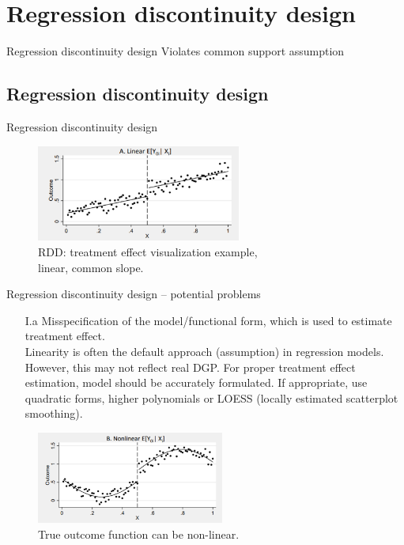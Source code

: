 \documentclass{beamer}
\begin{document}
\section{Regression discontinuity design}
\begin{frame}{Regression discontinuity design}
    Violates common support assumption
\end{frame}
\subsection{Regression discontinuity design}
\begin{frame}{Regression discontinuity design}
\begin{figure}
    \centering
    \includegraphics[width=0.6\textwidth]{./IMG/RDD1.png} 
    \caption*{RDD: treatment effect visualization example,\\ linear, common slope.}
    \label{fig:my_label}
\end{figure}    
  
    
\end{frame}
\begin{frame}{Regression discontinuity design -- potential problems}
\begin{itemize}
    \item[I.a] Misspecification of the model/functional form, which is used to estimate treatment effect.\\
    \bigskip
    Linearity is often the default approach (assumption) in regression models. However, this may not reflect real DGP. For proper treatment effect estimation, model should be accurately formulated. If appropriate, use quadratic forms, higher polynomials or LOESS (locally estimated scatterplot smoothing).
\end{itemize}
\begin{figure}
    \centering
    \includegraphics[width=0.55\textwidth]{./IMG/RDD2.png} 
    \caption*{True outcome function can be non-linear.} \label{fig:my_label1}
\end{figure}    
\end{frame}
\end{document}
